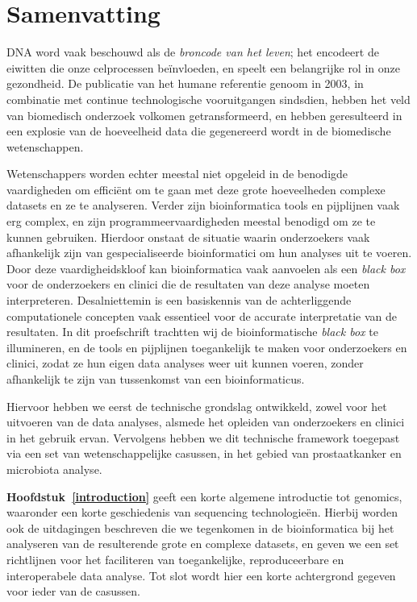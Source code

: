 \chapter{Samenvatting}

DNA word vaak beschouwd als de \emph{broncode van het leven}; het encodeert
de eiwitten die onze celprocessen beïnvloeden, en speelt een belangrijke rol in onze gezondheid.
De publicatie van het humane referentie genoom in 2003, in combinatie met continue technologische vooruitgangen sindsdien, hebben het veld van biomedisch onderzoek volkomen getransformeerd, en hebben geresulteerd in een explosie van de hoeveelheid data die gegenereerd wordt in de biomedische wetenschappen.

Wetenschappers worden echter meestal niet opgeleid in de benodigde vaardigheden om efficiënt om te gaan met deze grote hoeveelheden complexe datasets en ze te analyseren.
Verder zijn bioinformatica tools en pijplijnen vaak erg complex, en zijn programmeervaardigheden meestal benodigd om ze te kunnen gebruiken. Hierdoor onstaat de situatie waarin onderzoekers vaak afhankelijk zijn van gespecialiseerde bioinformatici om hun analyses uit te voeren.
Door deze vaardigheidskloof kan bioinformatica vaak aanvoelen als een \emph{black box} voor de onderzoekers en clinici die de resultaten van deze analyse moeten interpreteren.
Desalniettemin is een basiskennis van de achterliggende computationele concepten vaak essentieel voor de accurate interpretatie van de resultaten.
In dit proefschrift trachtten wij de bioinformatische \emph{black box} te illumineren, en de tools en pijplijnen toegankelijk te maken voor onderzoekers en clinici, zodat ze hun eigen data analyses weer uit kunnen voeren, zonder afhankelijk te zijn van tussenkomst van een bioinformaticus.

Hiervoor hebben we eerst de technische grondslag ontwikkeld, zowel voor het uitvoeren van de data analyses, alsmede het opleiden van onderzoekers en clinici in het gebruik ervan. Vervolgens hebben we dit technische framework toegepast via een set van wetenschappelijke casussen, in het gebied van prostaatkanker en microbiota analyse.

\textbf{Hoofdstuk~\ref{introduction}} geeft een korte algemene introductie tot genomics, waaronder een korte geschiedenis van sequencing technologieën.
Hierbij worden ook de uitdagingen beschreven die we tegenkomen in de bioinformatica bij het analyseren van de resulterende grote en complexe datasets, en geven we een set richtlijnen voor het faciliteren van toegankelijke, reproduceerbare en interoperabele data analyse.
Tot slot wordt hier een korte achtergrond gegeven voor ieder van de casussen.

